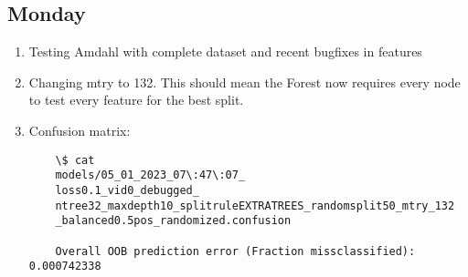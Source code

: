 \documentclass[12pt,oneside]{book}
\begin{document}
\subsection*{Monday}
\begin{enumerate}
  \item Testing Amdahl with complete dataset and recent bugfixes in features
  \item Changing mtry to 132. This should mean the Forest now requires every node to test every feature for the best split.
  \item Confusion matrix:
  \begin{lstlisting}
    \$ cat 
    models/05_01_2023_07\:47\:07_
    loss0.1_vid0_debugged_
    ntree32_maxdepth10_splitruleEXTRATREES_randomsplit50_mtry_132
    _balanced0.5pos_randomized.confusion 

    Overall OOB prediction error (Fraction missclassified): 0.000742338


\end{lstlisting}
\end{enumerate}
\end{document}
